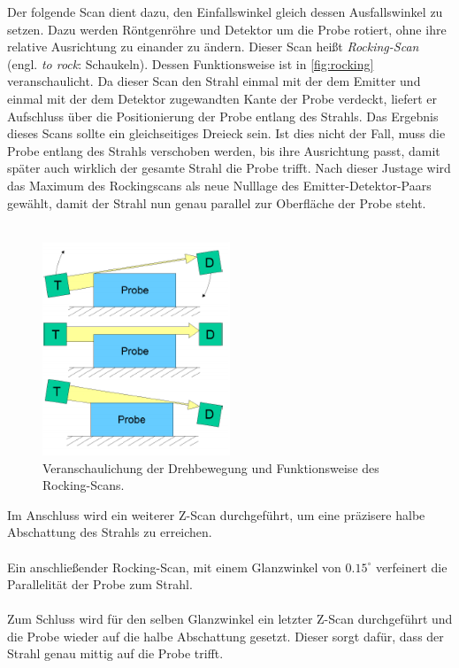 Der folgende Scan dient dazu, den Einfallswinkel gleich dessen Ausfallswinkel zu setzen. Dazu werden Röntgenröhre und Detektor um die Probe rotiert, ohne ihre relative Ausrichtung zu einander zu ändern. Dieser Scan heißt \textit{Rocking-Scan} (engl. \textit{to rock}: Schaukeln). Dessen Funktionsweise ist in \autoref{fig:rocking} veranschaulicht. Da dieser Scan den Strahl einmal mit der dem Emitter und einmal mit der dem Detektor zugewandten Kante der Probe verdeckt, liefert er Aufschluss über die Positionierung der Probe entlang des Strahls. Das Ergebnis dieses Scans sollte ein gleichseitiges Dreieck sein. Ist dies nicht der Fall, muss die Probe entlang des Strahls verschoben werden, bis ihre Ausrichtung passt, damit später auch wirklich der gesamte Strahl die Probe trifft. Nach dieser Justage wird das Maximum des Rockingscans als neue Nulllage des Emitter-Detektor-Paars gewählt, damit der Strahl nun genau parallel zur Oberfläche der Probe steht.\\
\\
\begin{figure}
    \centering
    \includegraphics[width=0.5\textwidth]{figures/rocking.png}
    \caption{Veranschaulichung der Drehbewegung und Funktionsweise des Rocking-Scans.}
    \label{fig:rocking}
\end{figure}
Im Anschluss wird ein weiterer Z-Scan durchgeführt, um eine präzisere halbe Abschattung des Strahls zu erreichen.\\
\\
Ein anschließender Rocking-Scan, mit einem Glanzwinkel von $0.15^\circ$ verfeinert die Parallelität der Probe zum Strahl.\\
\\
Zum Schluss wird für den selben Glanzwinkel ein letzter Z-Scan durchgeführt und die Probe wieder auf die halbe Abschattung gesetzt. Dieser sorgt dafür, dass der Strahl genau mittig auf die Probe trifft.

